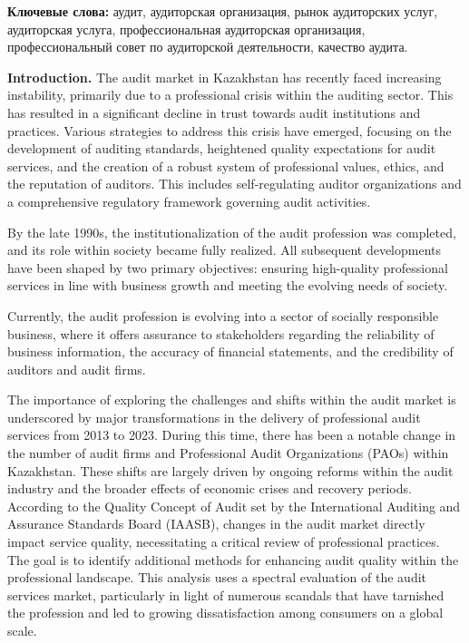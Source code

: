 \textbf{Ключевые слова:} аудит, аудиторская организация, рынок
аудиторских услуг, аудиторская услуга, профессиональная аудиторская
организация, профессиональный совет по аудиторской деятельности,
качество аудита. 
\begin{multicols}{2}

\textbf{Introduction.} The audit market in Kazakhstan has recently faced
increasing instability, primarily due to a professional crisis within
the auditing sector. This has resulted in a significant decline in trust
towards audit institutions and practices. Various strategies to address
this crisis have emerged, focusing on the development of auditing
standards, heightened quality expectations for audit services, and the
creation of a robust system of professional values, ethics, and the
reputation of auditors. This includes self-regulating auditor
organizations and a comprehensive regulatory framework governing audit
activities.

By the late 1990s, the institutionalization of the audit profession was
completed, and its role within society became fully realized. All
subsequent developments have been shaped by two primary objectives:
ensuring high-quality professional services in line with business growth
and meeting the evolving needs of society.

Currently, the audit profession is evolving into a sector of socially
responsible business, where it offers assurance to stakeholders
regarding the reliability of business information, the accuracy of
financial statements, and the credibility of auditors and audit firms.

The importance of exploring the challenges and shifts within the audit
market is underscored by major transformations in the delivery of
professional audit services from 2013 to 2023. During this time, there
has been a notable change in the number of audit firms and Professional
Audit Organizations (PAOs) within Kazakhstan. These shifts are largely
driven by ongoing reforms within the audit industry and the broader
effects of economic crises and recovery periods. According to the
Quality Concept of Audit set by the International Auditing and Assurance
Standards Board (IAASB), changes in the audit market directly impact
service quality, necessitating a critical review of professional
practices. The goal is to identify additional methods for enhancing
audit quality within the professional landscape. This analysis uses a
spectral evaluation of the audit services market, particularly in light
of numerous scandals that have tarnished the profession and led to
growing dissatisfaction among consumers on a global scale.


\end{multicols}

